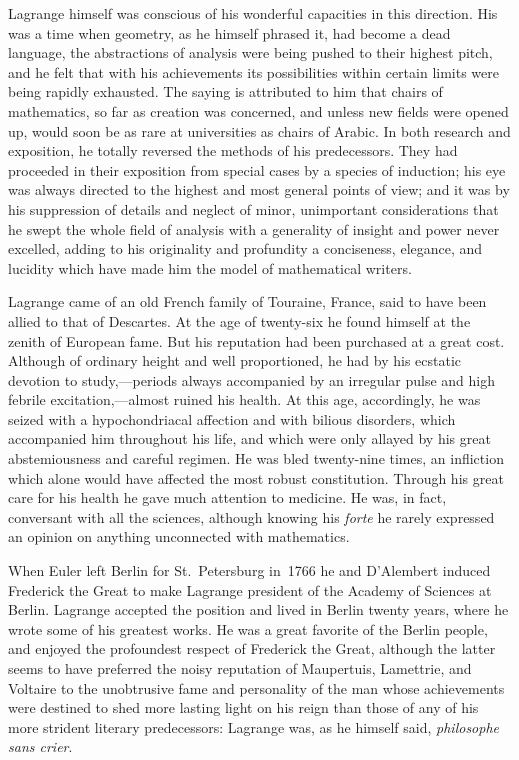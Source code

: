 \documentclass[12pt]{book}[2005/09/16]
\newcommand{\Typo}[2]{#2}
\newcommand{\PageSep}[1]{\ignorespaces}
\newcommand{\stars}{%
\begin{center}
  \makebox[1in][c]{
    \raisebox{-0.5ex}{*}\hfill\raisebox{0.5ex}{*}\hfill\raisebox{-0.5ex}{*}%
  }
\end{center}
}
\begin{document}
Lagrange himself was conscious of his wonderful capacities in
this direction. His was a time when geometry, as he himself
phrased it, had become a dead language, the abstractions of analysis
were being pushed to their highest pitch, and he felt that with
his achievements its possibilities within certain limits were being
rapidly exhausted. The saying is attributed to him that chairs of
mathematics, so far as creation was concerned, and unless new
fields were opened up, would soon be as rare at universities as
chairs of Arabic. In both research and exposition, he totally reversed
the methods of his predecessors. They had proceeded in
their exposition from special cases by a species of induction; his
eye was always directed to the highest and most general points of
view; and it was by his suppression of details and neglect of minor,
unimportant considerations that he swept the whole field of analysis
with a generality of insight and power never excelled, adding
to his originality and profundity a conciseness, elegance, and lucidity
which have made him the model of mathematical writers.
\stars

Lagrange came of an old French family of Touraine, France,
said to have been allied to that of Descartes. At the age of twenty-six
he found himself at the zenith of European fame. But his
reputation had been purchased at a great cost. Although of ordinary
\PageSep{xi}
height and well proportioned, he had by his ecstatic devotion
to study,---periods always accompanied by an irregular pulse and
high febrile \Typo{excitatian}{excitation},---almost ruined his health. At this age,
accordingly, he was seized with a hypochondriacal affection and
with bilious disorders, which accompanied him \Typo{thronghout}{throughout} his life,
and which were only allayed by his great abstemiousness and careful
regimen. He was bled twenty-nine times, an infliction which
alone would have affected the most robust constitution. Through
his great care for his health he gave much attention to medicine.
He was, in fact, conversant with all the sciences, although knowing
his \textit{forte} he rarely expressed an opinion on anything unconnected
with mathematics.

When Euler left Berlin for St.~Petersburg in~1766 he and
D'Alembert induced Frederick the Great to make Lagrange president
of the Academy of Sciences at Berlin. Lagrange accepted
the position and lived in Berlin twenty years, where he wrote some
of his greatest works. He was a great favorite of the Berlin people,
and enjoyed the profoundest respect of Frederick the Great,
although the latter seems to have preferred the noisy reputation of
Maupertuis, Lamettrie, and Voltaire to the unobtrusive fame and
personality of the man whose achievements were destined to shed
more lasting light on his reign than those of any of his more strident
literary predecessors: Lagrange was, as he himself said, \textit{philosophe
sans crier}.
\end{document}
